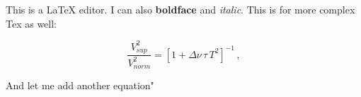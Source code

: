 This is a LaTeX editor. I can also \textbf{boldface} and \textit{italic}. This is for more complex Tex as well:

\begin{equation}
\frac{V_{ sup}^2}{V_{ norm}^2} = [1 + \Delta \nu \, \tau \, T^2 ]^{-1} \, ,
\end{equation}

And let me add another equation"